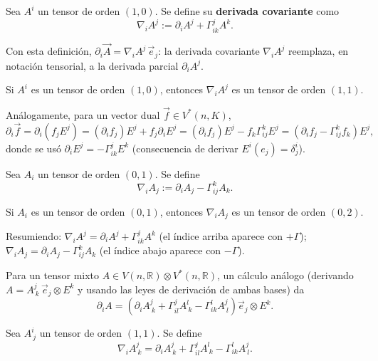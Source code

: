 \begin{definicion}
Sea $A^i$ un tensor de orden $(1,0)$. Se define su \textbf{derivada
covariante} como
\[
\nabla_i A^j := \partial_i A^j + \Gamma^j_{ik}A^k .
\]
\end{definicion}

Con esta definición, $\partial_i\vec A = \nabla_iA^j\,\vec e_j$: la
derivada covariante $\nabla_iA^j$ reemplaza, en notación tensorial, a la
derivada parcial $\partial_iA^j$.

\begin{proposicionc}
Si $A^i$ es un tensor de orden $(1,0)$, entonces $\nabla_iA^j$ es un
tensor de orden $(1,1)$.
\end{proposicionc}

Análogamente, para un vector dual $\vec f\in V^*(n,K)$,
\[
\partial_i\vec f = \partial_i(f_jE^j) = (\partial_if_j)E^j +
f_j\partial_iE^j = (\partial_if_j)E^j - f_k\Gamma^k_{ij}E^j =
\left(\partial_if_j - \Gamma^k_{ij}f_k\right)E^j ,
\]
donde se usó $\partial_iE^j = -\Gamma^j_{ik}E^k$ (consecuencia de derivar
$E^i(e_j)=\delta^i_j$).

\begin{definicion}
Sea $A_i$ un tensor de orden $(0,1)$. Se define
\[
\nabla_iA_j := \partial_iA_j - \Gamma^k_{ij}A_k .
\]
\end{definicion}

\begin{proposicionc}
Si $A_i$ es un tensor de orden $(0,1)$, entonces $\nabla_iA_j$ es un
tensor de orden $(0,2)$.
\end{proposicionc}

\begin{observacion}
Resumiendo: $\nabla_iA^j = \partial_iA^j+\Gamma^j_{ik}A^k$ (el índice
arriba aparece con $+\Gamma$); $\nabla_iA_j =
\partial_iA_j-\Gamma^k_{ij}A_k$ (el índice abajo aparece con $-\Gamma$).
\end{observacion}

Para un tensor mixto $A\in V(n,\mathbb{R})\otimes V^*(n,\mathbb{R})$, un
cálculo análogo (derivando $A=A^j_{\ k}\,\vec e_j\otimes E^k$ y usando
las leyes de derivación de ambas bases) da
\[
\partial_iA = \left(\partial_iA^j_{\ k} + \Gamma^j_{il}A^l_{\ k} -
\Gamma^l_{ik}A^j_{\ l}\right)\vec e_j\otimes E^k .
\]

\begin{definicion}
Sea $A^i_{\ j}$ un tensor de orden $(1,1)$. Se define
\[
\nabla_iA^j_{\ k} = \partial_iA^j_{\ k} + \Gamma^j_{il}A^l_{\ k} -
\Gamma^l_{ik}A^j_{\ l} .
\]
\end{definicion}

